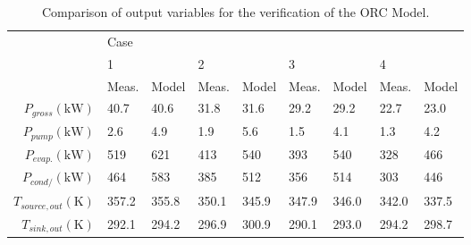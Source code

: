\begin{table}%
	\centering
	\caption{Comparison of output variables for the verification of the ORC Model.}
	\label{tab:verification_results01}
	\begin{tabular}{rllllllll}
		\toprule
		                                      & Case  &       &       &       &       &       &       &         \\ \cline{2-9}
		                                      & 1     &       & 2     &       & 3     &       & 4     &         \\
		                                      & Meas. & Model & Meas. & Model & Meas. & Model & Meas. & Model   \\ \midrule
		         $P_{gross}(\si{\kilo\watt})$ & 40.7  & 40.6  & 31.8  & 31.6  & 29.2  & 29.2  & 22.7  & 23.0    \\
		          $P_{pump}(\si{\kilo\watt})$ & 2.6   & 4.9   & 1.9   & 5.6   & 1.5   & 4.1   & 1.3   & 4.2     \\
		  $P_{evap.}(\si{\kilo\watt})$ & 519   & 621   & 413   & 540   & 393   & 540   & 328   & 466     \\
		  $P_{cond/}(\si{\kilo\watt})$ & 464   & 583   & 385   & 512   & 356   & 514   & 303   & 446     \\
		       $T_{source,out}(\si{\kelvin})$ & 357.2 & 355.8 & 350.1 & 345.9 & 347.9 & 346.0 & 342.0 & 337.5   \\
		         $T_{sink,out}(\si{\kelvin})$ & 292.1 & 294.2 & 296.9 & 300.9 & 290.1 & 293.0 & 294.2 & 298.7   \\ \bottomrule
\end{tabular}
\end{table}

